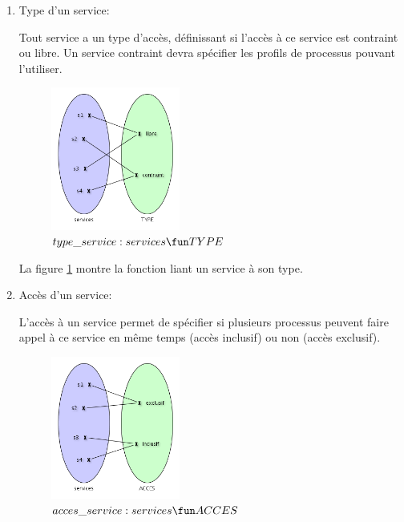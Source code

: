 \documentclass[french, titlepage, 10pt, a4paper]{article}
\begin{document}
\begin{enumerate}

  \item Type d'un service:

    Tout service a un type d'accès, définissant si l'accès à ce service est
    contraint ou libre.
    Un service contraint devra spécifier les profils de processus pouvant
    l'utiliser.

    \begin{figure}[htb]
      \centering
      \includegraphics[width=0.4\textwidth]{type_service.png}
      \caption{$type\_service: services \fun TYPE$}
      \label{fig:type_service}
    \end{figure}

    La figure \ref{fig:type_service} montre la fonction liant un service à son
    type.

  \item Accès d'un service:

    L'accès à un service permet de spécifier si plusieurs processus peuvent
    faire appel à ce service en même temps (accès inclusif) ou non (accès
    exclusif).

    \begin{figure}[htb]
      \centering
      \includegraphics[width=0.4\textwidth]{acces_service.png}
      \caption{$acces\_service: services \fun ACCES$}
      \label{fig:acces_service}
    \end{figure}


\end{enumerate}
\end{document}

